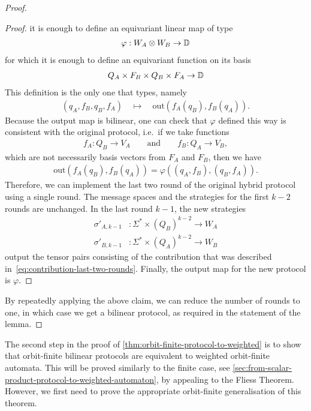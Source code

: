\begin{proof}
\begin{proof}
        it is enough to define an equivariant linear map of type 
        \begin{align*}
        \varphi : W_A \otimes W_B \to \mathbb D
        \end{align*}
        for which it is enough to define an equivariant function on its basis
        \begin{align*}
        Q_A \times F_B \times Q_B \times F_A \to \mathbb D
        \end{align*}
        This definition is the only one that types, namely 
        \begin{align*}
        (q_A, f_B, q_B, f_A) \quad 
        \mapsto \quad 
        \text{out}(f_A(q_B), f_B(q_A)).
        \end{align*}
        Because the output map is bilinear, one can check that $\varphi$ defined this way is consistent with the original protocol, i.e.~if we take functions 
        \begin{align*}
        f_A : Q_B \to V_A \qquad \text{and} \qquad f_B : Q_A \to V_B,
        \end{align*}
        which are not necessarily basis vectors from $F_A$ and $F_B$, then we have 
        \begin{align*}
        \text{out}(f_A(q_B), f_B(q_A)) = \varphi((q_A, f_B), (q_B, f_A)).
        \end{align*}
        Therefore, we can implement the last two round of the original hybrid protocol using a single round. The message spaces and the strategies for the first $k-2$ rounds are unchanged. In the last round $k-1$, the new strategies
        \begin{align*}
        \sigma'_{A,k-1} & : \Sigma^* \times (Q_B)^{k-2} \to W_A\\
        \sigma'_{B,k-1} & : \Sigma^* \times (Q_A)^{k-2} \to W_B
        \end{align*}
        output the tensor pairs consisting of the contribution that was described in~\eqref{eq:contribution-last-two-rounds}. Finally, the output  map for the new protocol is $\varphi$. 
    \end{proof}

    By repeatedly applying the above claim, we can reduce the number of rounds to one, in which case we get a bilinear protocol, as required in the statement of the lemma. 
\end{proof}

The second step in the proof of \cref{thm:orbit-finite-protocol-to-weighted} is to show that orbit-finite bilinear protocols are equivalent to weighted orbit-finite automata.  This will be proved similarly to the finite case, see \cref{sec:from-scalar-product-protocol-to-weighted-automaton}, by appealing to the Fliess Theorem. However, we first  need to prove the appropriate  orbit-finite generalisation  of this theorem.

